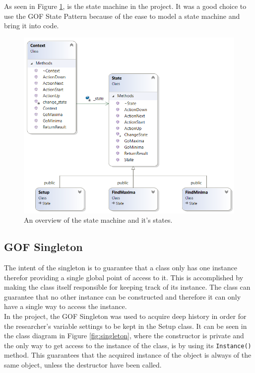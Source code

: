 As seen in Figure \ref{fig:statemachine}, is the state machine in the project. It was a good choice to use the GOF State Pattern because of the ease to model a state machine and bring it into code. 

\begin{figure}[H]
	\centering
	\includegraphics[width=0.8\linewidth]{diagram/StateMachine}
	\caption{An overview of the state machine and it's states.}
	\label{fig:statemachine}
\end{figure}

\clearpage

\subsection{GOF Singleton}\label{dp:singleton}
The intent of the singleton is to guarantee that a class only has one instance therefor providing a single global point of access to it. This is accomplished by making the class itself responsible for keeping track of its instance. The class can guarantee that no other instance can be constructed and therefore it can only have a single way to access the instance.\\

In the project, the GOF Singleton was used to acquire deep history in order for the researcher's variable settings to be kept in the Setup class. It can be seen in the class diagram in Figure \ref{fig:singleton}, where the constructor is private and the only way to get access to the instance of the class, is by using its \texttt{Instance()} method. This guarantees that the acquired instance of the object is always of the same object, unless the destructor have been called.

